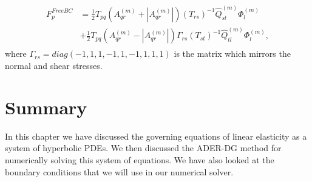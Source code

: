 \begin{align}
    \begin{split}
    F_{p}^{FreeBC} &= \frac{1}{2}T_{pq}\left(A_{qr}^{\left(m\right)} + \left|A_{qr}^{\left(m\right)}\right|\right) \left(T_{rs}\right)^{-1} \hat{Q}_{sl}^{\left(m\right)} \Phi_l^{\left(m\right)}
    \\ &+ \frac{1}{2} T_{pq} \left(A_{qr}^{\left(m\right)} - \left|A_{qr}^{\left(m\right)}\right|\right) \Gamma_{rs} \left(T_{st}\right)^{-1} \hat{Q}_{tl}^{\left(m\right)} \Phi_l^{\left(m\right)} ,
    \end{split}
\end{align}
where $\Gamma_{rs} = diag\left(-1,1,1,-1,1,-1,1,1,1\right)$ is the matrix which mirrors the normal and shear stresses.

\section{Summary}
In this chapter we have discussed the governing equations of linear elasticity as a system of hyperbolic \ac{PDE}s. We then discussed the 
\ac{ADER}-\ac{DG} method for numerically solving this system of equations. We have also looked at the boundary conditions that we will use in our numerical solver.
